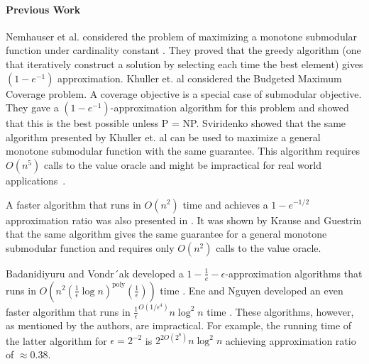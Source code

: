 \paragraph*{Previous Work}
Nemhauser et al. considered the problem of maximizing a monotone submodular function under cardinality constant \cite{Nemhauser1978}.
They proved that the greedy algorithm (one that iteratively construct a solution by selecting each time the best element) gives $(1 - e^{-1})$ approximation.
Khuller et. al considered the Budgeted Maximum Coverage problem\cite{khuller1999budgeted}.
A coverage objective is a special case of submodular objective.
They gave a $(1-e^{-1})$-approximation algorithm for this problem and showed that this is the best possible unless P = NP.
Sviridenko \cite{sviridenko2004note} showed that the same algorithm presented by
Khuller et. al can be used to maximize a general monotone submodular function
with the same guarantee.
This algorithm requires $O(n^5)$ calls to the value oracle and might be impractical for real world applications~\cite{lin2010multi}.

A faster algorithm that runs in $O(n^2)$ time and achieves a $1 - e^{-1/2}$ approximation ratio was also presented in \cite{khuller1999budgeted}.
It was shown by Krause and Guestrin \cite{krause2005note} that the same algorithm
gives the same guarantee for a general monotone submodular function and requires only $O(n^2)$ calls to the value oracle.

Badanidiyuru and Vondr´ak developed a $1 - \frac{1}{e} - \epsilon$-approximation 
algorithms that runs in 
$O(n^2(\frac{1}{\epsilon}\log n)^\text{poly}(\frac{1}{\epsilon}))$ time 
\cite{badanidiyuru2014fast}.
Ene and Nguyen developed an even faster algorithm that runs in $\frac{1}{\epsilon}^{O(1/\epsilon^4)}n \log^2 n$ time \cite{Alina2017}.
These algorithms, however, as mentioned by the authors, are impractical.
For example, the running time of the latter algorithm for $\epsilon = 2^{-2}$ is
$2^{2O(2^{8})}n\log^2n$ achieving approximation ratio of $\approx 0.38$.




